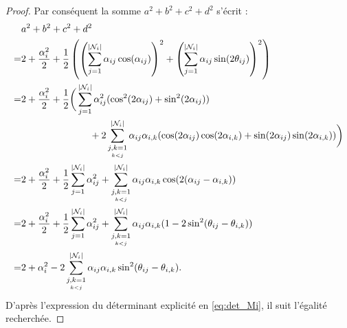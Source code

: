 \documentclass[12pt,a4paper]{article}
\begin{document}
\begin{proof}
		\newpage
		
		Par conséquent la somme $a^2+b^2+c^2+d^2$ s'écrit :\\
		\[
		\begin{aligned}
			& a^2 + b^2 + c^2 + d^2 \\
			=& 2 + \frac{\alpha_i^2}{2} + \frac12\left(\left(\sum_{j=1}^{\left\lvert \mathcal N_i \right\rvert}\alpha_{ij}\cos(\alpha_{ij})\right)^2 +\left(\sum_{j=1}^{\left\lvert \mathcal N_i \right\rvert}\alpha_{ij}\sin(2\theta_{ij})\right)^2 \right)\\
			=&2+\frac{\alpha_i^2}2 + \frac12\bigg(\sum_{j=1}^{\left\lvert \mathcal N_i \right\rvert}\alpha_{ij}^2(\cos^2(2\alpha_{ij})+\sin^2(2\alpha_{ij}))\\
			&\hspace{2.5cm} +2\sum_{\underset{k<j}{j,k=1}}^{\left\lvert \mathcal N_i \right\rvert} \alpha_{ij}\alpha_{i,k}(\cos(2\alpha_{ij})\cos(2\alpha_{i,k})+\sin(2\alpha_{ij})\sin(2\alpha_{i,k})) \bigg)\\
			= & 2+\frac{\alpha_i^2}2 + \frac12\sum_{j=1}^{\left\lvert \mathcal N_i \right\rvert} \alpha_{ij}^2 + \sum_{\underset{k<j}{j,k=1}}^{\left\lvert \mathcal N_i \right\rvert} \alpha_{ij}\alpha_{i,k}\cos(2(\alpha_{ij}-\alpha_{i,k}))\\
			= & 2+\frac{\alpha_i^2}2 + \frac12\sum_{j=1}^{\left\lvert \mathcal N_i \right\rvert} \alpha_{ij}^2+ \sum_{\underset{k<j}{j,k=1}}^{\left\lvert \mathcal N_i \right\rvert} \alpha_{ij}\alpha_{i,k}(1-2\sin^2(\theta_{ij}-\theta_{i,k}))\\
			= & 2+\alpha_i^2 - 2\sum_{\underset{k<j}{j,k=1}}^{\left\lvert \mathcal N_i \right\rvert} \alpha_{ij}\alpha_{i,k}\sin^2(\theta_{ij}-\theta_{i,k}).
		\end{aligned}
		\]
		D'après l'expression du déterminant explicité en \eqref{eq:det_Mi}, il suit l'égalité recherchée.
	\end{proof}
\end{document}
